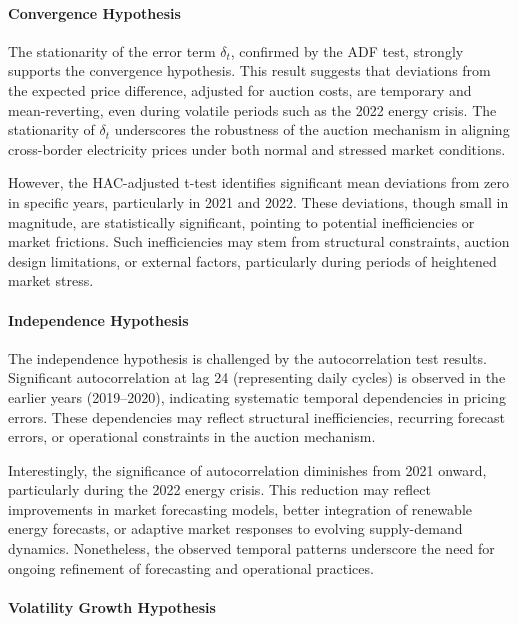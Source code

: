 \documentclass[12pt]{article}
\begin{document}
\paragraph{Convergence Hypothesis}

The stationarity of the error term $\delta_t$, confirmed by the ADF test, strongly supports the convergence hypothesis. This result suggests that deviations from the expected price difference, adjusted for auction costs, are temporary and mean-reverting, even during volatile periods such as the 2022 energy crisis. The stationarity of $\delta_t$ underscores the robustness of the auction mechanism in aligning cross-border electricity prices under both normal and stressed market conditions.

However, the HAC-adjusted t-test identifies significant mean deviations from zero in specific years, particularly in 2021 and 2022. These deviations, though small in magnitude, are statistically significant, pointing to potential inefficiencies or market frictions. Such inefficiencies may stem from structural constraints, auction design limitations, or external factors, particularly during periods of heightened market stress.

\paragraph{Independence Hypothesis}

The independence hypothesis is challenged by the autocorrelation test results. Significant autocorrelation at lag 24 (representing daily cycles) is observed in the earlier years (2019–2020), indicating systematic temporal dependencies in pricing errors. These dependencies may reflect structural inefficiencies, recurring forecast errors, or operational constraints in the auction mechanism.

Interestingly, the significance of autocorrelation diminishes from 2021 onward, particularly during the 2022 energy crisis. This reduction may reflect improvements in market forecasting models, better integration of renewable energy forecasts, or adaptive market responses to evolving supply-demand dynamics. Nonetheless, the observed temporal patterns underscore the need for ongoing refinement of forecasting and operational practices.

\paragraph{Volatility Growth Hypothesis}
\end{document}
